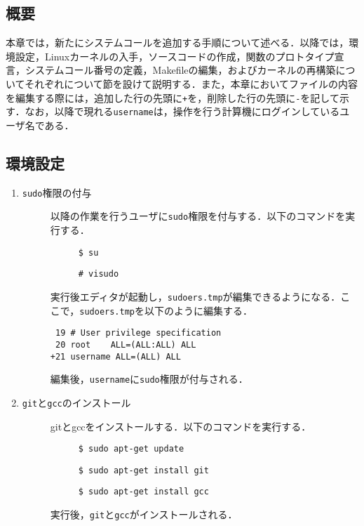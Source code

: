 \documentclass[12pt]{jsarticle}
\begin{document}
\subsection{概要}
本章では，新たにシステムコールを追加する手順について述べる．以降では，環境設定，Linuxカーネルの入手，ソースコードの作成，関数のプロトタイプ宣言，システムコール番号の定義，Makefileの編集，およびカーネルの再構築についてそれぞれについて節を設けて説明する．また，本章においてファイルの内容を編集する際には，追加した行の先頭に\verb|+|を，削除した行の先頭に\verb|-|を記して示す．なお，以降で現れる\verb|username|は，操作を行う計算機にログインしているユーザ名である．
\subsection{環境設定}
\begin{enumerate}
\item \verb|sudo|権限の付与
  \begin{description}
  \item[] 以降の作業を行うユーザに\verb|sudo|権限を付与する．以下のコマンドを実行する．
    \begin{description}
    \item[] \verb|$ su|
    \item[] \verb|# visudo|
    \end{description}
  \item[] 実行後エディタが起動し，\verb|sudoers.tmp|が編集できるようになる．ここで，\verb|sudoers.tmp|を以下のように編集する．
\begin{verbatim}
 19 # User privilege specification
 20 root    ALL=(ALL:ALL) ALL
+21 username ALL=(ALL) ALL
\end{verbatim}
    \item[] 編集後，\verb|username|に\verb|sudo|権限が付与される．
  \end{description}
\item \verb|git|と\verb|gcc|のインストール
  \begin{description}
  \item[] gitとgccをインストールする．以下のコマンドを実行する．
    \begin{description}
    \item[] \verb|$ sudo apt-get update|
    \item[] \verb|$ sudo apt-get install git|
    \item[] \verb|$ sudo apt-get install gcc|
    \end{description}
    \item[] 実行後，\verb|git|と\verb|gcc|がインストールされる．

\end{description}
\end{enumerate}
\end{document}
